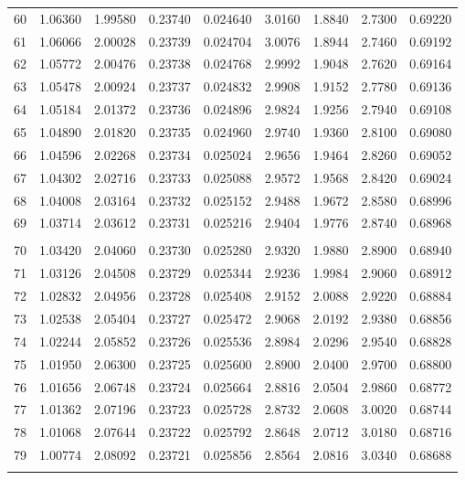 \documentclass[letter,twosides,10pt]{article}
\begin{document}
\begin{longtable}{|c|c|c|c|c|c|c|c|c|}
 60 & 1.06360 & 1.99580 & 0.23740 & 0.024640 & 3.0160 & 1.8840 & 2.7300 & 0.69220 \\
 61 & 1.06066 & 2.00028 & 0.23739 & 0.024704 & 3.0076 & 1.8944 & 2.7460 & 0.69192 \\
 62 & 1.05772 & 2.00476 & 0.23738 & 0.024768 & 2.9992 & 1.9048 & 2.7620 & 0.69164 \\
 63 & 1.05478 & 2.00924 & 0.23737 & 0.024832 & 2.9908 & 1.9152 & 2.7780 & 0.69136 \\
 64 & 1.05184 & 2.01372 & 0.23736 & 0.024896 & 2.9824 & 1.9256 & 2.7940 & 0.69108 \\
 65 & 1.04890 & 2.01820 & 0.23735 & 0.024960 & 2.9740 & 1.9360 & 2.8100 & 0.69080 \\
 66 & 1.04596 & 2.02268 & 0.23734 & 0.025024 & 2.9656 & 1.9464 & 2.8260 & 0.69052 \\
 67 & 1.04302 & 2.02716 & 0.23733 & 0.025088 & 2.9572 & 1.9568 & 2.8420 & 0.69024 \\
 68 & 1.04008 & 2.03164 & 0.23732 & 0.025152 & 2.9488 & 1.9672 & 2.8580 & 0.68996 \\
 69 & 1.03714 & 2.03612 & 0.23731 & 0.025216 & 2.9404 & 1.9776 & 2.8740 & 0.68968 \\
 & & & & & & & & \\
 70 & 1.03420 & 2.04060 & 0.23730 & 0.025280 & 2.9320 & 1.9880 & 2.8900 & 0.68940 \\
 71 & 1.03126 & 2.04508 & 0.23729 & 0.025344 & 2.9236 & 1.9984 & 2.9060 & 0.68912 \\
 72 & 1.02832 & 2.04956 & 0.23728 & 0.025408 & 2.9152 & 2.0088 & 2.9220 & 0.68884 \\
 73 & 1.02538 & 2.05404 & 0.23727 & 0.025472 & 2.9068 & 2.0192 & 2.9380 & 0.68856 \\
 74 & 1.02244 & 2.05852 & 0.23726 & 0.025536 & 2.8984 & 2.0296 & 2.9540 & 0.68828 \\
 75 & 1.01950 & 2.06300 & 0.23725 & 0.025600 & 2.8900 & 2.0400 & 2.9700 & 0.68800 \\
 76 & 1.01656 & 2.06748 & 0.23724 & 0.025664 & 2.8816 & 2.0504 & 2.9860 & 0.68772 \\
 77 & 1.01362 & 2.07196 & 0.23723 & 0.025728 & 2.8732 & 2.0608 & 3.0020 & 0.68744 \\
 78 & 1.01068 & 2.07644 & 0.23722 & 0.025792 & 2.8648 & 2.0712 & 3.0180 & 0.68716 \\
 79 & 1.00774 & 2.08092 & 0.23721 & 0.025856 & 2.8564 & 2.0816 & 3.0340 & 0.68688 \\
 & & & & & & & & \\

\end{longtable}
\end{document}
